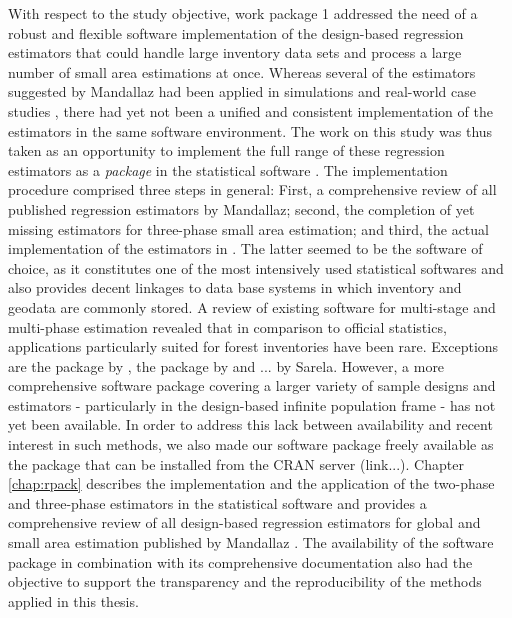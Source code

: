 With respect to the study objective, work package 1 addressed the need of a robust and flexible software implementation of the design-based regression estimators that could handle large inventory data sets and process a large number of small area estimations at once. Whereas several of the estimators suggested by Mandallaz had been applied in simulations and real-world case studies \citep{mandallaz2013a, mandallaz2013b, mandallaz2013c, massey2014a, massey2015a, massey2015b}, there had yet not been a unified and consistent implementation of the estimators in the same software environment. The work on this study was thus taken as an opportunity to implement the full range of these regression estimators as a \textit{package} in the statistical software . The implementation procedure comprised three steps in general: First, a comprehensive review of all published regression estimators by Mandallaz; second, the completion of yet missing estimators for three-phase small area estimation; and third, the actual implementation of the estimators in . The latter seemed to be the software of choice, as it constitutes one of the most intensively used statistical softwares and also provides decent linkages to data base systems in which inventory and geodata are commonly stored. A review of existing software for multi-stage and multi-phase estimation revealed that in comparison to official statistics, applications particularly suited for forest inventories have been rare. Exceptions are the  package  by \citet{josae2015}, the  package by \citet{cullmann2016} and ... by Sarela. However, a more comprehensive software package covering a larger variety of sample designs and estimators - particularly in the design-based infinite population frame - has not yet been available. In order to address this lack between availability and recent interest in such methods, we also made our software package freely available as the  package  that can be installed from the CRAN server (link...). Chapter \ref{chap:rpack} describes the implementation and the application of the two-phase and three-phase estimators in the statistical software  and provides a comprehensive review of all design-based regression estimators for global and small area estimation published by Mandallaz \citep{mandallaz2008,mandallaz2013a, mandallaz2013b, mandallaz2013c}. The availability of the software package in combination with its comprehensive documentation also had the objective to support the transparency and the reproducibility of the methods applied in this thesis.


